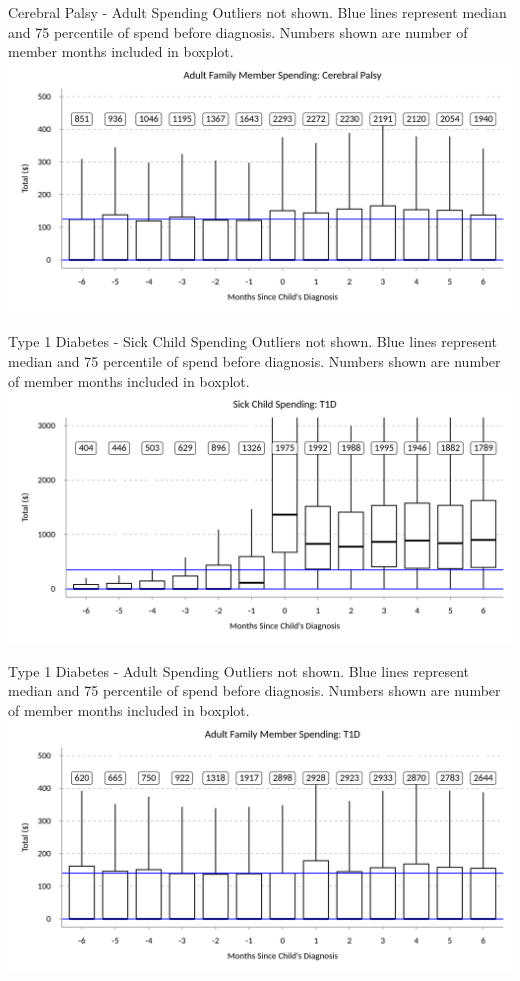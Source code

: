 \documentclass[xcolor=x11names,compress]{beamer}
\renewcommand{\(}{\begin{columns}}
\renewcommand{\)}{\end{columns}}
\newcommand{\<}[1]{\begin{column}{#1}}
\renewcommand{\>}{\end{column}}
\begin{document}
\begin{frame}{Cerebral Palsy - Adult Spending}
\small
Outliers not shown. Blue lines represent median and 75 percentile of spend before diagnosis. Numbers
shown are number of member months included in boxplot. 
\includegraphics[width=\linewidth]{../figures/adult_family_spend_cerebral.png}
\end{frame}

\begin{frame}{Type 1 Diabetes - Sick Child Spending}
\small
Outliers not shown. Blue lines represent median and 75 percentile of spend before diagnosis. Numbers
shown are number of member months included in boxplot. 
\includegraphics[width=\linewidth]{../figures/sick_child_spend_T1D.png}
\end{frame}

\begin{frame}{Type 1 Diabetes - Adult Spending}
\small
Outliers not shown. Blue lines represent median and 75 percentile of spend before diagnosis. Numbers
shown are number of member months included in boxplot. 
\includegraphics[width=\linewidth]{../figures/adult_family_spend_T1D.png}
\end{frame}
\end{document}

